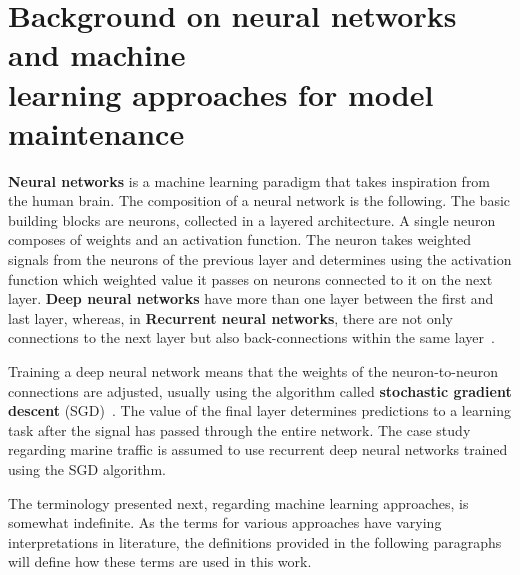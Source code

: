 \section[Background on neural networks and machine learning approaches for model maintenance]{Background on neural networks and machine\\ learning approaches for model maintenance}

\enlargethispage{14mm}
\textbf{Neural networks} is a machine learning paradigm that takes inspiration from the human brain. The composition of a neural network is the following. The basic building blocks are neurons, collected in a layered architecture. A single neuron composes of weights and an activation function. The neuron takes weighted signals from the neurons of the previous layer and determines using the activation function which weighted value it passes on neurons connected to it on the next layer. \textbf{Deep neural networks} have more than one layer between the first and last layer, whereas, in \textbf{Recurrent neural networks}, there are not only connections to the next layer but also back-connections within the same layer~\cite{ben-nunDemystifyingParallelDistributed2019}. 

 Training a deep neural network means that the weights of the neuron-to-neuron connections are adjusted, usually using the algorithm called \textbf{stochastic gradient descent} (SGD)~\cite{ben-nunDemystifyingParallelDistributed2019}. The value of the final layer determines predictions to a learning task after the signal has passed through the entire network. The case study regarding marine traffic is assumed to use recurrent deep neural networks trained using the SGD algorithm.

The terminology presented next, regarding machine learning approaches, is somewhat indefinite. As the terms for various approaches have varying interpretations in literature, the definitions provided in the following paragraphs will define how these terms are used in this work.

